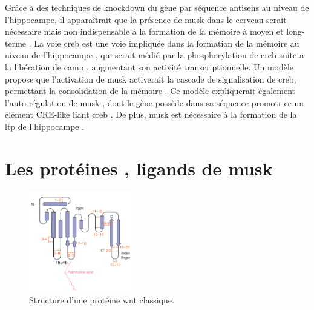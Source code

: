 	Grâce à des techniques de knockdown du gène par séquence antisens au niveau de l'hippocampe, il apparaîtrait que la présence de \gls{musk} dans le cerveau serait nécessaire mais non indispensable à la formation de la mémoire à moyen et long-terme \cite{Garcia-Osta2006}. La voie \gls{creb} est une voie impliquée dans la formation de la mémoire au niveau de l'hippocampe \cite{Silva1998, Kandel2012,Kida2014,Ortega-Martinez2015}, qui serait médié par la phosphorylation de \gls{creb} suite a la libération de \acrshort{camp} , augmentant son activité transcriptionnelle. Un modèle propose que l'activation de \gls{musk} activerait la cascade de signalisation de \gls{creb}, permettant la consolidation de la mémoire \cite{Garcia-Osta2006} . Ce modèle expliquerait également l'auto-régulation de \gls{musk} \cite{Moore2001}, dont le gène possède dans sa séquence promotrice un élément CRE-like liant \gls{creb} \cite{Kim2005}. De plus, \gls{musk} est nécessaire à la formation de la \gls{ltp} de l'hippocampe \cite{Garcia-Osta2006}.

\section{Les protéines , ligands de \acrshort{musk}}
\label{sec:IntroWnt}	
	\begin{figure}
		\includegraphics[width=0.4\textwidth]{./Images/WntProtein.png}	
		\caption{Structure d'une protéine \Gls{wnt} classique.}
		\label{fig:WntProt}
	\end{figure}
	
	
